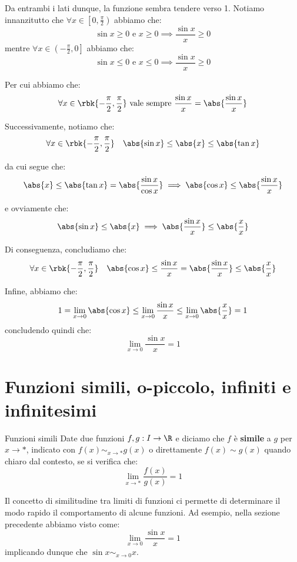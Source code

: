 \documentclass[a4paper, 12pt]{report}
\begin{document}
    Da entrambi i lati dunque, la funzione sembra tendere verso 1. Notiamo innanzitutto che $\forall x \in  \left [ 0, \frac{\pi}{2} \right )$ abbiamo che:
    \[ \sin x \geq 0 \text{ e } x \geq 0 \implies \frac{\sin x}{x} \geq 0\]
    mentre $\forall x \in  \left (-\frac{\pi}{2}, 0 \right ]$ abbiamo che:
    \[ \sin x \leq 0 \text{ e } x \leq 0 \implies \frac{\sin x}{x} \geq 0\]

    Per cui abbiamo che:
    \[\forall x \in \rbk{-\frac{\pi}{2}, \frac{\pi}{2}} \text{ vale sempre } \frac{\sin x}{x} = \abs{\frac{\sin x}{x}}\]

    Successivamente, notiamo che:
    \[\forall x \in \rbk{-\frac{\pi}{2}, \frac{\pi}{2}} \quad \abs{\sin x} \leq \abs{x} \leq \abs{\tan x}\]

    da cui segue che:
    \[\abs{x} \leq \abs{\tan x} = \abs{\frac{\sin x}{\cos x}} \implies \abs{\cos x} \leq \abs{\frac{\sin x}{x}}\]
    
    e ovviamente che:
    \[\abs{\sin x} \leq \abs{x} \implies \abs{\frac{\sin x}{x}} \leq \abs{\frac{x}{x}}\]

    Di conseguenza, concludiamo che:
    \[\forall x \in \rbk{-\frac{\pi}{2}, \frac{\pi}{2}} \quad \abs{\cos x} \leq \frac{\sin x}{x} = \abs{\frac{\sin x}{x}} \leq \abs{\frac{x}{x}}\]

    Infine, abbiamo che:
    \[1 = \lim_{x \to 0} \abs{\cos x} \leq \lim_{x \to 0} \frac{\sin x}{x} \leq \lim_{x \to 0} \abs{\frac{x}{x}} = 1\]
    concludendo quindi che:
    \[\lim_{x \to 0} \frac{\sin x}{x} = 1\]

    \newpage

    \section{Funzioni simili, o-piccolo, infiniti e infinitesimi}
    
    \begin{frameddefn}{Funzioni simili}
        Date due funzioni $f,g : I \to \R$ e diciamo che $f$ è \textbf{simile} a $g$ per $x \to *$, indicato con $f(x) \sim_{x \to *} g(x)$ o direttamente $f(x) \sim g(x)$ quando chiaro dal contesto, se si verifica che:
        \[\lim_{x \to *} \frac{f(x)}{g(x)} = 1\]
    \end{frameddefn}

    Il concetto di similitudine tra limiti di funzioni ci permette di determinare il modo rapido il comportamento di alcune funzioni. Ad esempio, nella sezione precedente abbiamo visto come:
    \[\lim_{x \to 0} \frac{\sin x}{x} = 1\]
    implicando dunque che $\sin x \sim_{x \to 0} x$. 
\end{document}

